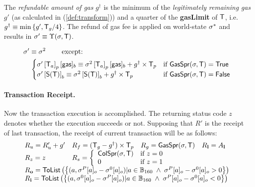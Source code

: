 The \emph{refundable amount of gas} $g^{\dagger}$ is the minimum of the \emph{legitimately remaining gas} $g'$ (as calculated in (\ref{def:transform})) and a quarter of the \textbf{gasLimit} of $\textsf{T}$,
	i.e. $g^{\dagger}\equiv \min{\left \{{g', \textsf{T}_g/4} \right \}}$.
The refund of gas fee is applied on world-state $\mathbf{\sigma}^{*}$ and results in $\mathbf{\sigma}'\equiv \Upsilon(\mathbf{\sigma},\textsf{T})$.

\begin{align}
	& \mathbf{\sigma}'  \equiv \mathbf{\sigma}^2 \qquad \mbox{  except:}\\
	& \quad \begin{cases} 
		\mathbf{\sigma}'\left[\textsf{T}_a\right]_p[{\sf gas}]_b \equiv \mathbf{\sigma}^2\left[\textsf{T}_a\right]_p[{\sf gas}]_b+g^{\dagger}\times \textsf{T}_p 
		& \mbox{if $\mathsf{GasSpr}(\mathbf{\sigma},\textsf{T})=\mathsf{True}$}\\
		\mathbf{\sigma}' \left[\mathsf{S}{\left({\textsf{T}} \right)}\right]_b \equiv \mathbf{\sigma}^2\left[\mathsf{S}{\left({\textsf{T}} \right)}\right]_b + g^{\dagger}\times \textsf{T}_p 
		& \mbox{if $\mathsf{GasSpr}(\mathbf{\sigma},\textsf{T})=\mathsf{False}$}
	\end{cases} 
\end{align}

\paragraph{Transaction Receipt.} 

Now the transaction execution is accomplished.
The returning status code $z$ denotes whether the execution succeeds or not. 
Supposing that $R'$ is the receipt of last transaction, 
the receipt of current transaction will be as follows:
\begin{align}
	\begin{array}{llll}
		R_u=R'_u+g' & R_f = (\tx_g-g^{\dagger})\times \tx_p & R_g = \mathsf{GasSpr}(\st,\tx) & R_{\bf l}=A_{\bf l} \\ 
		R_z=z & \multicolumn{3}{l}{R_s = \left\{\begin{array}{ll}
			\mathsf{ColSpr}(\st,\tx) & \text{if }z=0\\
			0 & \text{if }z=1
		\end{array}\right.} \\
		\multicolumn{4}{l}{R_{\bf o}=\mathsf{ToList}\left(\left\{ (a,\st^P[a]_o - \st^0[a]_o) | a\in \B_{160}\;\wedge\; \st^P[a]_o - \st^0[a]_o>0 \right\}\right)}\\
		\multicolumn{4}{l}{R_{\bf i}=\mathsf{ToList}\left(\left\{(a,\st^0[a]_o - \st^P[a]_o) | a\in \B_{160}\;\wedge\; \st^P[a]_o - \st^0[a]_o<0  \right\}\right)}
	\end{array}
\end{align}


